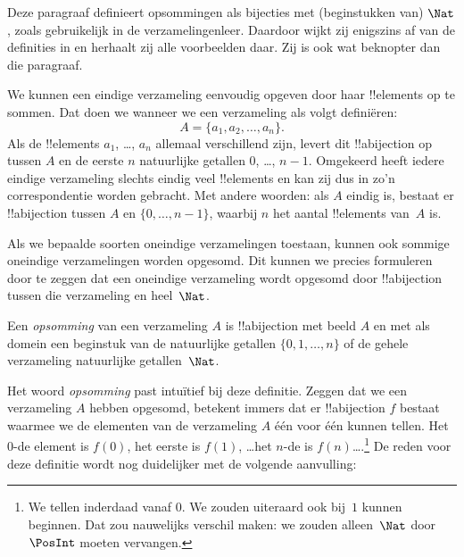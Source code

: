 \documentclass[../../../include/open-logic-section]{subfiles}
\begin{document}


\begin{editorial}
  Deze paragraaf definieert opsommingen als bijecties met
  (beginstukken van) $\Nat$, zoals gebruikelijk in de
  verzamelingenleer. Daardoor wijkt zij enigszins af van de definities
  in  en herhaalt zij alle voorbeelden daar. Zij is
  ook wat beknopter dan die paragraaf.
\end{editorial}

We kunnen een eindige verzameling eenvoudig opgeven door haar
!!{element}s op te sommen. Dat doen we wanneer we een verzameling als
volgt definiëren:
\[
  A = \{a_1, a_2, \ldots, a_n\}.
\]
Als de !!{element}s $a_1$, \dots, $a_n$ allemaal verschillend zijn,
levert dit !!a{bijection} op tussen $A$ en de eerste $n$ natuurlijke
getallen $0$, \dots, $n-1$. Omgekeerd heeft iedere eindige
verzameling slechts eindig veel !!{element}s en kan zij dus in zo'n
correspondentie worden gebracht. Met andere woorden: als $A$ eindig
is, bestaat er !!a{bijection} tussen $A$ en $\{0, \dots, n-1\}$,
waarbij $n$ het aantal !!{element}s van~$A$ is.

Als we bepaalde soorten oneindige verzamelingen toestaan, kunnen ook
sommige oneindige verzamelingen worden opgesomd. Dit kunnen we precies
formuleren door te zeggen dat een oneindige verzameling wordt
opgesomd door !!a{bijection} tussen die verzameling en heel~$\Nat$.

\begin{defn}
Een \emph{opsomming} van een verzameling $A$ is !!a{bijection} met
beeld $A$ en met als domein een beginstuk van de natuurlijke getallen
$\{0, 1, \ldots, n\}$ {of} de gehele verzameling natuurlijke
getallen~$\Nat$.
\end{defn}

\begin{explain}
Het woord \emph{opsomming} past intuïtief bij deze definitie. Zeggen
dat we een verzameling $A$ hebben opgesomd, betekent immers dat er
!!a{bijection} $f$ bestaat waarmee we de elementen van de verzameling
$A$ één voor één kunnen tellen. Het $0$-de element is $f(0)$, het
eerste is $f(1)$, \ldots het $n$-de is $f(n)$\ldots.\footnote{We
tellen inderdaad vanaf $0$. We zouden uiteraard ook bij~$1$ kunnen
beginnen. Dat zou nauwelijks verschil maken: we zouden alleen~$\Nat$
door~$\PosInt$ moeten vervangen.} De reden voor deze definitie wordt
nog duidelijker met de volgende aanvulling:
\end{explain}
\end{document}
